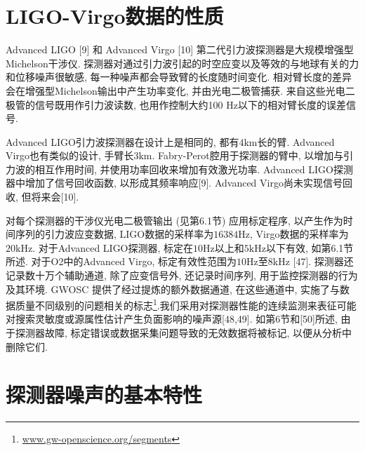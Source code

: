 \documentclass[a4paper]{\documentclassname}
\def\t{\text}
\theoremstyle{definition}
\begin{document}
\section{LIGO-Virgo数据的性质}

Advanced LIGO [9] 和 Advanced Virgo [10] 第二代引力波探测器是大规模增强型Michelson干涉仪. 探测器对通过引力波引起的时空应变以及等效的与地球有关的力和位移噪声很敏感, 每一种噪声都会导致臂的长度随时间变化. 相对臂长度的差异会在增强型Michelson输出中产生功率变化, 并由光电二极管捕获. 来自这些光电二极管的信号既用作引力波读数, 也用作控制大约100 Hz以下的相对臂长度的误差信号. 

Advanced LIGO引力波探测器在设计上是相同的, 都有$4\t{km}$长的臂. Advanced Virgo也有类似的设计, 手臂长$3\t{km}$. Fabry-Perot腔用于探测器的臂中, 以增加与引力波的相互作用时间, 并使用功率回收来增加有效激光功率. Advanced LIGO探测器中增加了信号回收函数, 以形成其频率响应[9]. Advanced Virgo尚未实现信号回收, 但将来会[10]. 

对每个探测器的干涉仪光电二极管输出 (见第6.1节) 应用标定程序, 以产生作为时间序列的引力波应变数据, LIGO数据的采样率为$16384 \t{Hz}$, Virgo数据的采样率为$20 \t{kHz}$. 对于Advanced LIGO探测器, 标定在$10 \t{Hz}$以上和$5 \t{kHz}$以下有效, 如第6.1节所述. 对于O2中的Advanced Virgo, 标定有效性范围为$10 \t{Hz}$至$8 \t{kHz}$ [47]. 探测器还记录数十万个辅助通道, 除了应变信号外, 还记录时间序列, 用于监控探测器的行为及其环境. GWOSC 提供了经过提炼的额外数据通道, 在这些通道中, 实施了与数据质量不同级别的问题相关的标志\footnote{\href{www.gw-openscience.org/segments}{www.gw-openscience.org/segments}}.我们采用对探测器性能的连续监测来表征可能对搜索灵敏度或源属性估计产生负面影响的噪声源[48,49].  如第6节和[50]所述, 由于探测器故障, 标定错误或数据采集问题导致的无效数据将被标记, 以便从分析中删除它们. 

\section{探测器噪声的基本特性}
\end{document}
